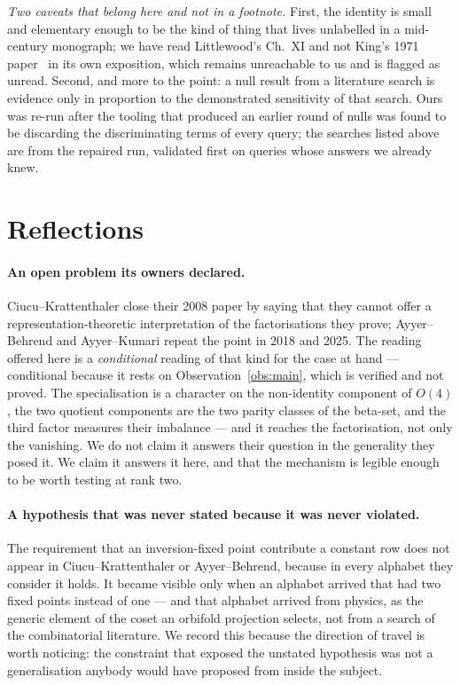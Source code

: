 \documentclass[11pt,a4paper]{article}
\begin{document}
\emph{Two caveats that belong here and not in a footnote.} First, the identity is small and
elementary enough to be the kind of thing that lives unlabelled in a mid-century monograph; we
have read Littlewood's Ch.~XI and not King's 1971 paper~\cite{King71} in its own exposition, which remains
unreachable to us and is flagged as unread. Second, and more to the point: a null result from a
literature search is evidence only in proportion to the demonstrated sensitivity of that
search. Ours was re-run after the tooling that produced an earlier round of nulls was found to
be discarding the discriminating terms of every query; the searches listed above are from the
repaired run, validated first on queries whose answers we already knew.

\section{Reflections}\label{sec:reflections}

\paragraph{An open problem its owners declared.} Ciucu--Krattenthaler close their 2008 paper by
saying that they cannot offer a representation-theoretic interpretation of the factorisations
they prove; Ayyer--Behrend and Ayyer--Kumari repeat the point in 2018 and 2025. The reading
offered here is a \emph{conditional} reading of that kind for the case at hand --- conditional
because it rests on Observation~\ref{obs:main}, which is verified and not proved. The
specialisation is a
character on the non-identity component of $O(4)$, the two quotient components are the two parity
classes of the beta-set, and the third factor measures their imbalance --- and it reaches the
factorisation, not only the vanishing. We do not claim it answers their question in the
generality they posed it. We claim it answers it here, and that the mechanism is legible enough
to be worth testing at rank two.

\paragraph{A hypothesis that was never stated because it was never violated.} The requirement
that an inversion-fixed point contribute a constant row does not appear in
Ciucu--Krattenthaler or Ayyer--Behrend, because in every alphabet they consider it holds. It
became visible only when an alphabet arrived that had two fixed points instead of one --- and
that alphabet arrived from physics, as the generic element of the coset an orbifold projection
selects, not from a search of the combinatorial literature. We record this because the
direction of travel is worth noticing: the constraint that exposed the unstated hypothesis was
not a generalisation anybody would have proposed from inside the subject.
\end{document}
